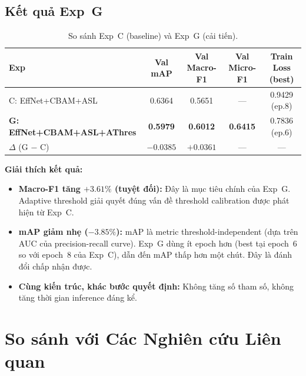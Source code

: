 \documentclass{article}
\begin{document}
\subsection{Kết quả Exp~G}

\begin{table}[H]
  \caption{So sánh Exp~C (baseline) và Exp~G (cải tiến).}
  \label{tab:expg_results}
  \centering
  \begin{tabular}{lcccc}
    \toprule
    \textbf{Exp} & \textbf{Val mAP} & \textbf{Val Macro-F1} & \textbf{Val Micro-F1} & \textbf{Train Loss (best)} \\
    \midrule
    C: EffNet+CBAM+ASL       & 0.6364 & 0.5651 & --- & 0.9429 (ep.8) \\
    \textbf{G: EffNet+CBAM+ASL+AThres} & \textbf{0.5979} & \textbf{0.6012} & \textbf{0.6415} & 0.7836 (ep.6) \\
    \midrule
    $\Delta$ (G $-$ C)       & $-0.0385$ & $\mathbf{+0.0361}$ & --- & --- \\
    \bottomrule
  \end{tabular}
\end{table}

\textbf{Giải thích kết quả:}
\begin{itemize}[leftmargin=1.8em]
  \item \textbf{Macro-F1 tăng $+3.61\%$ (tuyệt đối):} Đây là mục tiêu chính
        của Exp~G. Adaptive threshold giải quyết đúng vấn đề threshold
        calibration được phát hiện từ Exp~C.
  \item \textbf{mAP giảm nhẹ ($-3.85\%$):} mAP là metric threshold-independent
        (dựa trên AUC của precision-recall curve). Exp~G dùng ít epoch hơn
        (best tại epoch~6 so với epoch~8 của Exp~C), dẫn đến mAP thấp hơn một
        chút. Đây là đánh đổi chấp nhận được.
  \item \textbf{Cùng kiến trúc, khác bước quyết định:} Không tăng số tham số,
        không tăng thời gian inference đáng kể.
\end{itemize}

\section{So sánh với Các Nghiên cứu Liên quan}
\end{document}
